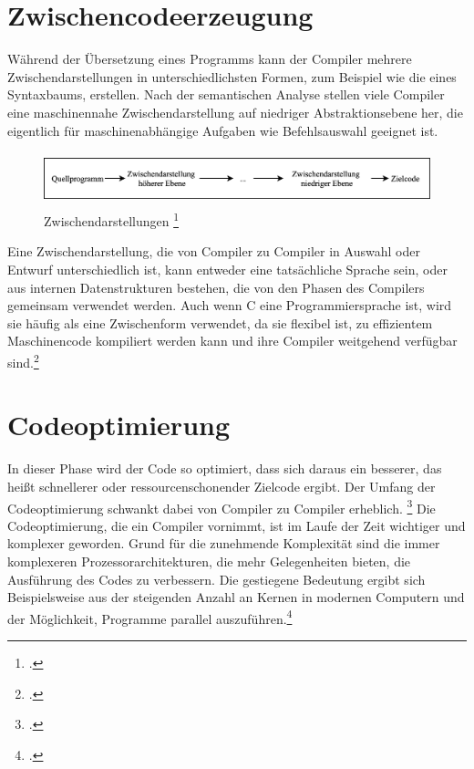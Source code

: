 \section{Zwischencodeerzeugung}
Während der Übersetzung eines Programms  kann der Compiler mehrere Zwischendarstellungen in unterschiedlichsten Formen,  zum Beispiel wie die eines Syntaxbaums, erstellen.  
Nach der semantischen Analyse stellen viele Compiler eine maschinennahe Zwischendarstellung auf niedriger Abstraktionsebene her, die eigentlich für maschinenabhängige Aufgaben wie Befehlsauswahl geeignet ist. 
\begin{figure}[!ht]
 \includegraphics[width=14.5cm,height=1.52cm]{Images/Compiler/Zwischendarstellungen.png}
 \caption[Zwischendarstellungen]{Zwischendarstellungen \protect\footcite{Ullmann2008} }
 \label{fig:Zwischendarstellung}
\end{figure}
Eine Zwischendarstellung, die von Compiler zu Compiler in Auswahl oder Entwurf unterschiedlich ist,  kann entweder eine tatsächliche Sprache sein,  oder aus internen Datenstrukturen bestehen, die von den Phasen des Compilers gemeinsam verwendet werden. Auch wenn C eine Programmiersprache ist, wird sie häufig als eine Zwischenform verwendet, da sie flexibel ist, zu effizientem Maschinencode kompiliert werden kann und ihre Compiler weitgehend verfügbar sind.\footcite[Vgl.][S. 433]{Ullmann2008}


\section{Codeoptimierung}
In dieser Phase wird der Code so optimiert, dass sich daraus ein besserer,  das heißt schnellerer oder ressourcenschonender Zielcode ergibt.  Der Umfang der Codeoptimierung schwankt dabei von Compiler zu Compiler erheblich.  \footcite[Vgl.][S. 11f]{Ullmann2008} 
Die Codeoptimierung, die ein Compiler vornimmt, ist im Laufe der Zeit wichtiger und  komplexer geworden. Grund für die zunehmende Komplexität sind die immer komplexeren Prozessorarchitekturen, die mehr Gelegenheiten bieten, die Ausführung des  Codes zu verbessern. Die gestiegene Bedeutung ergibt sich Beispielsweise aus der steigenden Anzahl an Kernen in modernen Computern und der Möglichkeit, Programme parallel auszuführen.\footcite[Vgl.][S. 20]{Ullmann2008}

